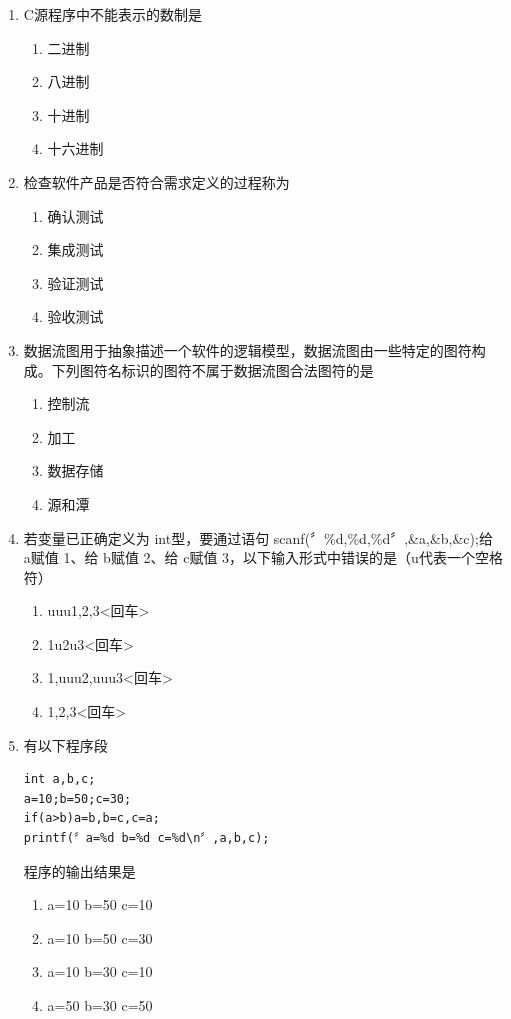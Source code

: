 \documentclass[12pt,a4paper]{article}
\begin{document}
\begin{enumerate}
    \item C源程序中不能表示的数制是
    \begin{enumerate}
        \item[A)] 二进制
        \item[B)] 八进制
        \item[C)] 十进制
        \item[D)] 十六进制
    \end{enumerate}
    
    \item 检查软件产品是否符合需求定义的过程称为
    \begin{enumerate}
        \item[A)] 确认测试
        \item[B)] 集成测试
        \item[C)] 验证测试
        \item[D)] 验收测试
    \end{enumerate}
    
    \item 数据流图用于抽象描述一个软件的逻辑模型，数据流图由一些特定的图符构成。下列图符名标识的图符不属于数据流图合法图符的是
    \begin{enumerate}
        \item[A)] 控制流
        \item[B)] 加工
        \item[C)] 数据存储
        \item[D)] 源和潭
    \end{enumerate}
    
    \item 若变量已正确定义为 int型，要通过语句 scanf(〞\%d,\%d,\%d〞,\&a,\&b,\&c);给 a赋值 1、给 b赋值 2、给 c赋值 3，以下输入形式中错误的是（u代表一个空格符）
    \begin{enumerate}
        \item[A)] uuu1,2,3<回车>
        \item[B)] 1u2u3<回车>
        \item[C)] 1,uuu2,uuu3<回车>
        \item[D)] 1,2,3<回车>
    \end{enumerate}
    
    \item 有以下程序段
    \begin{verbatim}
int a,b,c;
a=10;b=50;c=30;
if(a>b)a=b,b=c,c=a;
printf(〞a=%d b=%d c=%d\n〞,a,b,c);
    \end{verbatim}
    程序的输出结果是
    \begin{enumerate}
        \item[A)] a=10 b=50 c=10
        \item[B)] a=10 b=50 c=30
        \item[C)] a=10 b=30 c=10
        \item[D)] a=50 b=30 c=50
    \end{enumerate}
\end{enumerate}
\end{document}
